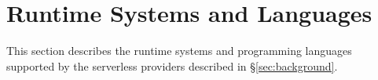 
\section{Runtime Systems and Languages}
\label{sec:runtime}

This section describes the runtime systems and programming languages supported by the serverless providers described in \S\ref{sec:background}. 

